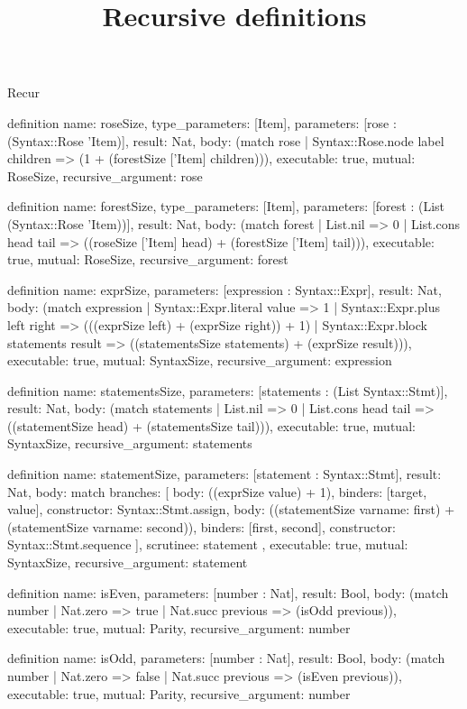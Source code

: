 \begin{lexlean}{Recur}
\title{Recursive definitions}
\begin{semanticmodule}
definition{
  name: roseSize,
  type_parameters: [Item],
  parameters: [rose : (Syntax::Rose 'Item)],
  result: Nat,
  body: (match rose | Syntax::Rose.node label children => (1 + (forestSize ['Item] children))),
  executable: true,
  mutual: RoseSize,
  recursive_argument: rose
}

definition{
  name: forestSize,
  type_parameters: [Item],
  parameters: [forest : (List (Syntax::Rose 'Item))],
  result: Nat,
  body: (match forest
    | List.nil => 0
    | List.cons head tail => ((roseSize ['Item] head) + (forestSize ['Item] tail))),
  executable: true,
  mutual: RoseSize,
  recursive_argument: forest
}

definition{
  name: exprSize,
  parameters: [expression : Syntax::Expr],
  result: Nat,
  body: (match expression
    | Syntax::Expr.literal value => 1
    | Syntax::Expr.plus left right => (((exprSize left) + (exprSize right)) + 1)
    | Syntax::Expr.block statements result => ((statementsSize statements) + (exprSize result))),
  executable: true,
  mutual: SyntaxSize,
  recursive_argument: expression
}

definition{
  name: statementsSize,
  parameters: [statements : (List Syntax::Stmt)],
  result: Nat,
  body: (match statements
    | List.nil => 0
    | List.cons head tail => ((statementSize head) + (statementsSize tail))),
  executable: true,
  mutual: SyntaxSize,
  recursive_argument: statements
}

definition{
  name: statementSize,
  parameters: [statement : Syntax::Stmt],
  result: Nat,
  body: match{
    branches: [
      {body: ((exprSize value) + 1), binders: [target, value], constructor: Syntax::Stmt.assign},
      {
        body: ((statementSize var{name: first}) + (statementSize var{name: second})),
        binders: [first, second],
        constructor: Syntax::Stmt.sequence
      }
    ],
    scrutinee: statement
  },
  executable: true,
  mutual: SyntaxSize,
  recursive_argument: statement
}

definition{
  name: isEven,
  parameters: [number : Nat],
  result: Bool,
  body: (match number | Nat.zero => true | Nat.succ previous => (isOdd previous)),
  executable: true,
  mutual: Parity,
  recursive_argument: number
}

definition{
  name: isOdd,
  parameters: [number : Nat],
  result: Bool,
  body: (match number | Nat.zero => false | Nat.succ previous => (isEven previous)),
  executable: true,
  mutual: Parity,
  recursive_argument: number
}


\end{semanticmodule}
\end{lexlean}
